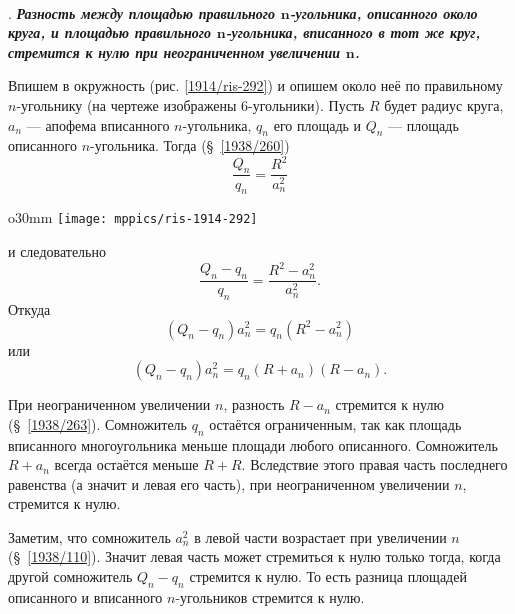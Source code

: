 \paragraph{}\label{1914/230}
.
\textbf{\emph{Разность между площадью правильного $\bm{n}$-угольника, описанного около круга, и площадью правильного $\bm{n}$-угольника, вписанного в тот же
круг, стремится к нулю при неограниченном увеличении $\bm{n}$.}}

Впишем в окружность (рис. \ref{1914/ris-292}) и опишем около неё по правильному $n$-угольнику (на чертеже изображены $6$-угольники).
Пусть $R$ будет радиус круга, $a_n$ — апофема вписанного $n$-угольника, $q_n$ его площадь и $Q_n$ — площадь описанного $n$-угольника.
Тогда (§~\ref{1938/260})
\[\frac {Q_n}{q_n}=\frac{R^2}{a_n^2}\]

\begin{wrapfigure}[12]{o}{30mm}
\vskip-3mm
\centering
\texttt{[image: mppics/ris-1914-292]}
\caption{}\label{1914/ris-292}
\end{wrapfigure}
\noindent
и следовательно 
\[\frac {Q_n-q_n}{q_n}=\frac{R^2-a_n^2}{a_n^2}.\]
Откуда
\[(Q_n-q_n)a_n^2=q_n(R^2-a_n^2)\]
или
\[(Q_n-q_n)a_n^2=q_n(R+a_n)(R-a_n).\]


При неограниченном увеличении $n$, разность $R-a_n$ стремится к нулю (§~\ref{1938/263}).
Сомножитель $q_n$ остаётся ограниченным, так как площадь вписанного многоугольника меньше площади любого описанного.  
Сомножитель $R+a_n$ всегда остаётся меньше $R+R$.
Вследствие этого правая часть последнего равенства (а значит и левая его часть),
при неограниченном увеличении $n$, стремится к нулю.

Заметим, что сомножитель $a_n^2$ в левой части возрастает при увеличении $n$ (§~\ref{1938/110}).
Значит левая часть может стремиться к нулю только тогда, когда другой сомножитель $Q_n-q_n$ стремится к нулю.
То есть разница площадей описанного и вписанного $n$-угольников стремится к нулю.

